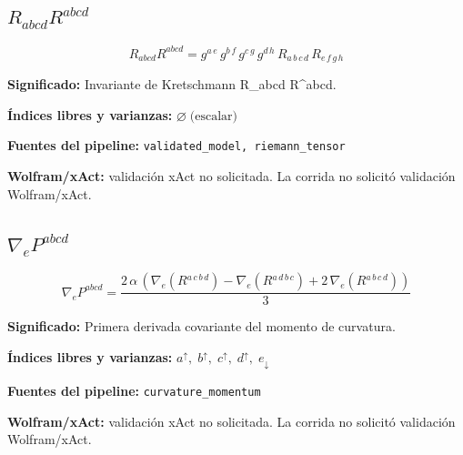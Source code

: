 \documentclass[11pt]{article}
\begin{document}
\subsection*{$ R_{abcd}R^{abcd} $}
\begin{dmath*}[breakdepth={5}]
R_{abcd}R^{abcd} = g{}^{a\,e}\,g{}^{b\,f}\,g{}^{c\,g}\,g{}^{d\,h}\,R{}_{a\,b\,c\,d}\,R{}_{e\,f\,g\,h}
\end{dmath*}
\par\vspace{1.2\baselineskip}\noindent
\begin{minipage}{\linewidth}
\textbf{Significado:} Invariante de Kretschmann R\_abcd R^abcd.\par
\textbf{Índices libres y varianzas:} $ \varnothing\;\text{(escalar)} $\par
\textbf{Fuentes del pipeline:} \texttt{validated\_model, riemann\_tensor}\par
\textbf{Wolfram/xAct:} validación xAct no solicitada. La corrida no solicitó validación Wolfram/xAct.\par
\end{minipage}
\subsection*{$ \nabla_e P^{abcd} $}
\begin{dmath*}[breakdepth={5}]
\nabla_e P^{abcd} = \frac{2\,\alpha\,\left(\nabla_{e}\!\left(R{}^{a\,c\,b\,d}\right) - \nabla_{e}\!\left(R{}^{a\,d\,b\,c}\right) + 2\,\nabla_{e}\!\left(R{}^{a\,b\,c\,d}\right)\right)}{3}
\end{dmath*}
\par\vspace{1.2\baselineskip}\noindent
\begin{minipage}{\linewidth}
\textbf{Significado:} Primera derivada covariante del momento de curvatura.\par
\textbf{Índices libres y varianzas:} $ a^{\uparrow},\;b^{\uparrow},\;c^{\uparrow},\;d^{\uparrow},\;e_{\downarrow} $\par
\textbf{Fuentes del pipeline:} \texttt{curvature\_momentum}\par
\textbf{Wolfram/xAct:} validación xAct no solicitada. La corrida no solicitó validación Wolfram/xAct.\par
\end{minipage}
\end{document}
